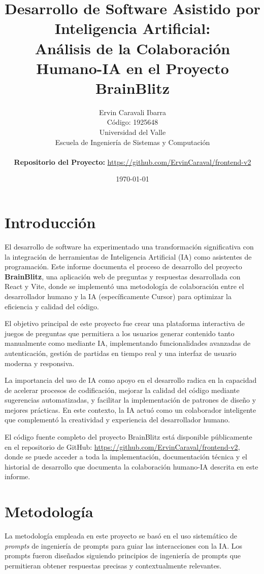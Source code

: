 \documentclass[12pt,a4paper]{article}
\title{\textbf{Desarrollo de Software Asistido por Inteligencia Artificial:\\
Análisis de la Colaboración Humano-IA en el Proyecto BrainBlitz}}
\author{Ervin Caravali Ibarra\\
Código: 1925648\\
Universidad del Valle\\
Escuela de Ingeniería de Sistemas y Computación\\
\\
\textbf{Repositorio del Proyecto:} \url{https://github.com/ErvinCaraval/frontend-v2}}
\date{\today}
\begin{document}
\maketitle

\newpage

\tableofcontents

\newpage

\section{Introducción}

El desarrollo de software ha experimentado una transformación significativa con la integración de herramientas de Inteligencia Artificial (IA) como asistentes de programación. Este informe documenta el proceso de desarrollo del proyecto \textbf{BrainBlitz}, una aplicación web de preguntas y respuestas desarrollada con React y Vite, donde se implementó una metodología de colaboración entre el desarrollador humano y la IA (específicamente Cursor) para optimizar la eficiencia y calidad del código.

El objetivo principal de este proyecto fue crear una plataforma interactiva de juegos de preguntas que permitiera a los usuarios generar contenido tanto manualmente como mediante IA, implementando funcionalidades avanzadas de autenticación, gestión de partidas en tiempo real y una interfaz de usuario moderna y responsiva.

La importancia del uso de IA como apoyo en el desarrollo radica en la capacidad de acelerar procesos de codificación, mejorar la calidad del código mediante sugerencias automatizadas, y facilitar la implementación de patrones de diseño y mejores prácticas. En este contexto, la IA actuó como un colaborador inteligente que complementó la creatividad y experiencia del desarrollador humano.

El código fuente completo del proyecto BrainBlitz está disponible públicamente en el repositorio de GitHub: \url{https://github.com/ErvinCaraval/frontend-v2}, donde se puede acceder a toda la implementación, documentación técnica y el historial de desarrollo que documenta la colaboración humano-IA descrita en este informe.

\section{Metodología}

La metodología empleada en este proyecto se basó en el uso sistemático de \textit{prompts} de ingeniería de prompts para guiar las interacciones con la IA. Los prompts fueron diseñados siguiendo principios de ingeniería de prompts que permitieran obtener respuestas precisas y contextualmente relevantes.
\end{document}
